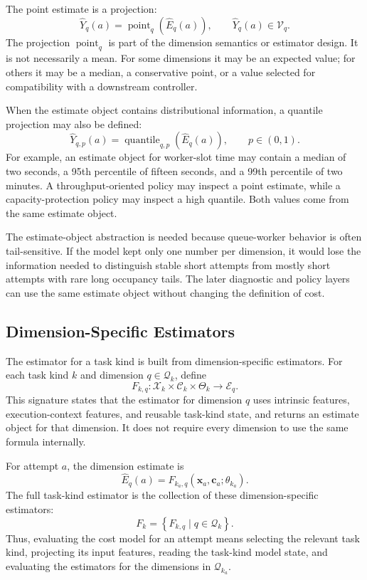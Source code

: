 The point estimate is a projection:
\[
\widehat{Y}_q(a)
=
\operatorname{point}_q\!\left(\widehat{E}_q(a)\right),
\qquad
\widehat{Y}_q(a) \in \mathcal{V}_q.
\]
The projection $\operatorname{point}_q$ is part of the dimension semantics or
estimator design. It is not necessarily a mean. For some dimensions it may be an
expected value; for others it may be a median, a conservative point, or a value
selected for compatibility with a downstream controller.

When the estimate object contains distributional information, a quantile
projection may also be defined:
\[
\widehat{Y}_{q,p}(a)
=
\operatorname{quantile}_{q,p}\!\left(\widehat{E}_q(a)\right),
\qquad
p \in (0,1).
\]
For example, an estimate object for worker-slot time may contain a median of
two seconds, a 95th percentile of fifteen seconds, and a 99th percentile of two
minutes. A throughput-oriented policy may inspect a point estimate, while a
capacity-protection policy may inspect a high quantile. Both values come from
the same estimate object.

The estimate-object abstraction is needed because queue-worker behavior is often
tail-sensitive. If the model kept only one number per dimension, it would lose
the information needed to distinguish stable short attempts from mostly short
attempts with rare long occupancy tails. The later diagnostic and policy layers
can use the same estimate object without changing the definition of cost.

\subsection{Dimension-Specific Estimators}
\label{sec:cost-dimension-specific-estimators}

The estimator for a task kind is built from dimension-specific estimators. For
each task kind $k$ and dimension $q \in \mathcal{Q}_k$, define
\[
F_{k,q}
:
\mathcal{X}_k
\times
\mathcal{C}_k
\times
\Theta_k
\rightarrow
\mathcal{E}_q.
\]
This signature states that the estimator for dimension $q$ uses intrinsic
features, execution-context features, and reusable task-kind state, and returns
an estimate object for that dimension. It does not require every dimension to
use the same formula internally.

For attempt $a$, the dimension estimate is
\[
\widehat{E}_q(a)
=
F_{k_a,q}\!\left(
\mathbf{x}_a,
\mathbf{c}_a;
\theta_{k_a}
\right).
\]
The full task-kind estimator is the collection of these dimension-specific
estimators:
\[
F_k
=
\left\{
F_{k,q}
\mid
q \in \mathcal{Q}_k
\right\}.
\]
Thus, evaluating the cost model for an attempt means selecting the relevant task
kind, projecting its input features, reading the task-kind model state, and
evaluating the estimators for the dimensions in $\mathcal{Q}_{k_a}$.


